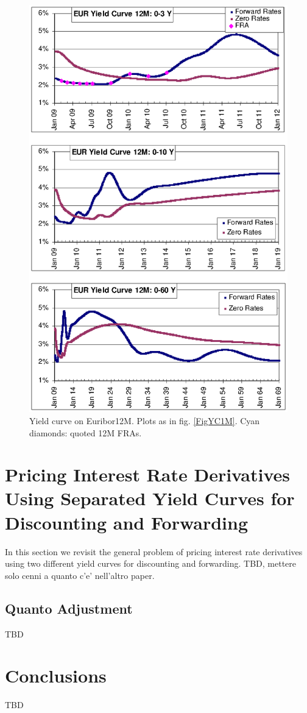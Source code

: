 \documentclass[11pt,reqno]{amsart}
\begin{document}
\begin{figure}[tbp]
\centering
\includegraphics[scale=0.9]{./FigYC12M}
\caption{Yield curve on Euribor12M. Plots as in fig. \protect\ref{FigYC1M}. Cyan diamonds: quoted 12M FRAs.}
\label{FigYC3M}
\end{figure}

\section{\label{SecPricing2curves}Pricing Interest Rate Derivatives Using Separated Yield Curves for
Discounting and Forwarding}
In this section we revisit the general problem of pricing interest rate derivatives using two different yield curves for discounting and forwarding.
TBD, mettere solo cenni a quanto c'e' nell'altro paper.


\subsection{Quanto Adjustment}
TBD


\section{\label{SecConclusions}Conclusions}

TBD




\end{document}

